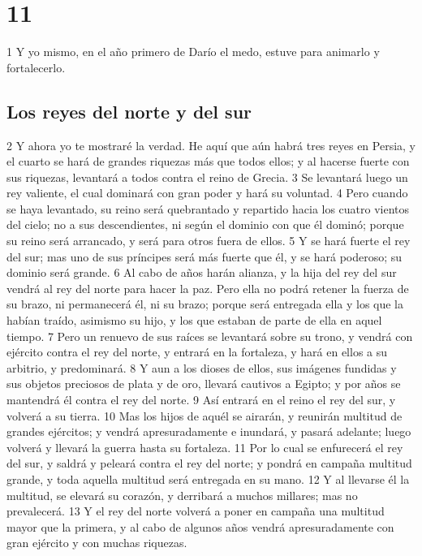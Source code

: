 \chapter{11}

1 Y yo mismo, en el año primero de Darío el medo, estuve para animarlo y fortalecerlo.

\section*{Los reyes del norte y del sur}

2 Y ahora yo te mostraré la verdad. He aquí que aún habrá tres reyes en Persia, y el cuarto se hará de grandes riquezas más que todos ellos; y al hacerse fuerte con sus riquezas, levantará a todos contra el reino de Grecia.
3 Se levantará luego un rey valiente, el cual dominará con gran poder y hará su voluntad.
4 Pero cuando se haya levantado, su reino será quebrantado y repartido hacia los cuatro vientos del cielo; no a sus descendientes, ni según el dominio con que él dominó; porque su reino será arrancado, y será para otros fuera de ellos.
5 Y se hará fuerte el rey del sur; mas uno de sus príncipes será más fuerte que él, y se hará poderoso; su dominio será grande.
6 Al cabo de años harán alianza, y la hija del rey del sur vendrá al rey del norte para hacer la paz. Pero ella no podrá retener la fuerza de su brazo, ni permanecerá él, ni su brazo; porque será entregada ella y los que la habían traído, asimismo su hijo, y los que estaban de parte de ella en aquel tiempo.
7 Pero un renuevo de sus raíces se levantará sobre su trono, y vendrá con ejército contra el rey del norte, y entrará en la fortaleza, y hará en ellos a su arbitrio, y predominará.
8 Y aun a los dioses de ellos, sus imágenes fundidas y sus objetos preciosos de plata y de oro, llevará cautivos a Egipto; y por años se mantendrá él contra el rey del norte.
9 Así entrará en el reino el rey del sur, y volverá a su tierra.
10 Mas los hijos de aquél se airarán, y reunirán multitud de grandes ejércitos; y vendrá apresuradamente e inundará, y pasará adelante; luego volverá y llevará la guerra hasta su fortaleza.
11 Por lo cual se enfurecerá el rey del sur, y saldrá y peleará contra el rey del norte; y pondrá en campaña multitud grande, y toda aquella multitud será entregada en su mano.
12 Y al llevarse él la multitud, se elevará su corazón, y derribará a muchos millares; mas no prevalecerá.
13 Y el rey del norte volverá a poner en campaña una multitud mayor que la primera, y al cabo de algunos años vendrá apresuradamente con gran ejército y con muchas riquezas.
